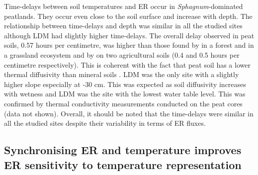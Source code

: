Time-delays between soil temperatures and ER occur in \textit{Sphagnum}-dominated peatlands.
They occur even close to the soil surface and increase with depth.
The relationship between time-delays and depth was similar in all the studied sites although LDM had slightly higher time-delays.
The overall delay observed in peat soils, 0.57 hours per centimetre, was higher than those found by \citet{pavelka2007} in a forest and in a grassland ecosystem and by \citet{parkin2003} on two agricultural soils (0.4 and 0.5 hours per centimetre respectively).
This is coherent with the fact that peat soil has a lower thermal diffusivity than mineral soils \citep{farouki1981,arya2001}.
LDM was the only site with a slightly higher slope especially at -30 cm.
This was expected as soil diffusivity increases with wetness \citep{hillel2003} and LDM was the site with the lowest water table level.
This was confirmed by thermal conductivity measurements conducted on the peat cores (data not shown).
Overall, it should be noted that the time-delays were similar in all the studied sites despite their variability in terms of ER fluxes.

\subsection{Synchronising ER and temperature improves ER sensitivity to temperature representation}

